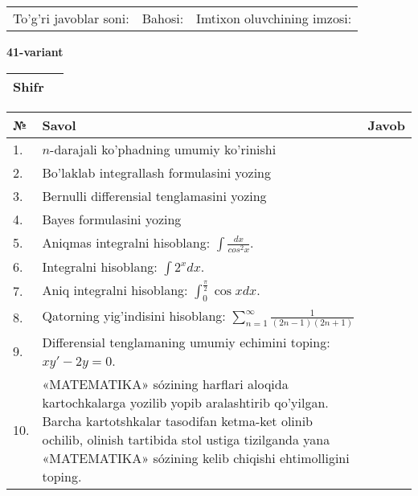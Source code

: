 \documentclass{article}
\begin{document}
  \vspace{1cm}
  
  \begin{tabular}{lll}
  To'g'ri javoblar soni: \underline{\hspace{1.5cm}} & 
  Bahosi: \underline{\hspace{1.5cm}} & 
  Imtixon oluvchining imzosi: \underline{\hspace{2cm}} \\
  \end{tabular}
  
  \egroup
  
  \newpage
  
  
  \textbf{41-variant}\\
  
  \bgroup
  \def\arraystretch{1.6} %
  
  \begin{tabular}{|m{5.7cm}|m{9.5cm}|}
  \hline
  Shifr & \\
  \hline
  \end{tabular}
  
  \vspace{1cm}
  
  \begin{tabular}{|m{0.7cm}|m{10cm}|m{4cm}|}
  \hline
  № & Savol & Javob \\
  \hline
  1. & \(n\)-darajali ko'phadning umumiy ko'rinishi &  \\
  \hline
  2. & Bo'laklab integrallash formulasini yozing &  \\
  \hline
  3. & Bernulli differensial tenglamasini yozing &  \\
  \hline
  4. & Bayes formulasini yozing &  \\
  \hline
  5. & Aniqmas integralni hisoblang: \(\int \frac{dx}{cos^{2}x}\). &  \\
  \hline
  6. & Integralni hisoblang: \(\int {2^{x}dx}\). &  \\
  \hline
  7. & Aniq integralni hisoblang: \(\int_{0}^{\frac{\pi}{2}}{\cos xdx}\). &  \\
  \hline
  8. & Qatorning yig'indisini hisoblang: \(\sum_{n = 1}^{\infty}\frac{1}{(2n - 1)(2n + 1)}\) &  \\
  \hline
  9. & Differensial tenglamaning umumiy echimini toping: \(xy' - 2y = 0\). &  \\
  \hline
  10. & «MATEMATIKA» sózining harflari aloqida kartochkalarga yozilib yopib aralashtirib qo'yilgan. Barcha kartotshkalar tasodifan ketma-ket olinib ochilib, olinish tartibida stol ustiga tizilganda yana «MATEMATIKA» sózining kelib chiqishi ehtimolligini toping. &  \\
  \hline
  \end{tabular}
  
\end{document}

